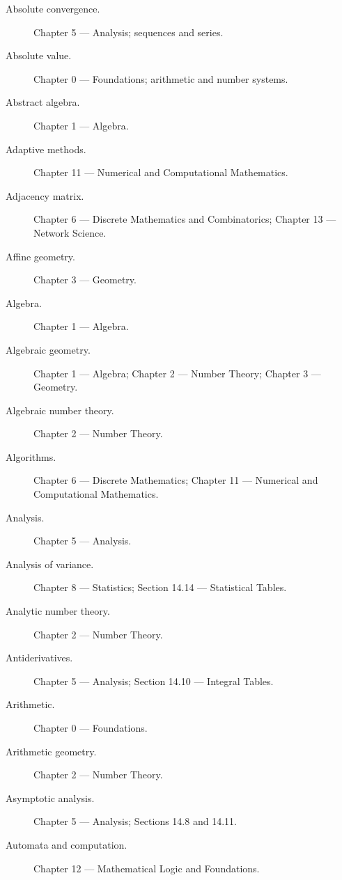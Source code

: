 \begin{description}

\item[Absolute convergence.]
Chapter 5 --- Analysis; sequences and series.

\item[Absolute value.]
Chapter 0 --- Foundations; arithmetic and number systems.

\item[Abstract algebra.]
Chapter 1 --- Algebra.

\item[Adaptive methods.]
Chapter 11 --- Numerical and Computational Mathematics.

\item[Adjacency matrix.]
Chapter 6 --- Discrete Mathematics and Combinatorics;
Chapter 13 --- Network Science.

\item[Affine geometry.]
Chapter 3 --- Geometry.

\item[Algebra.]
Chapter 1 --- Algebra.

\item[Algebraic geometry.]
Chapter 1 --- Algebra;
Chapter 2 --- Number Theory;
Chapter 3 --- Geometry.

\item[Algebraic number theory.]
Chapter 2 --- Number Theory.

\item[Algorithms.]
Chapter 6 --- Discrete Mathematics;
Chapter 11 --- Numerical and Computational Mathematics.

\item[Analysis.]
Chapter 5 --- Analysis.

\item[Analysis of variance.]
Chapter 8 --- Statistics;
Section 14.14 --- Statistical Tables.

\item[Analytic number theory.]
Chapter 2 --- Number Theory.

\item[Antiderivatives.]
Chapter 5 --- Analysis;
Section 14.10 --- Integral Tables.

\item[Arithmetic.]
Chapter 0 --- Foundations.

\item[Arithmetic geometry.]
Chapter 2 --- Number Theory.

\item[Asymptotic analysis.]
Chapter 5 --- Analysis;
Sections 14.8 and 14.11.

\item[Automata and computation.]
Chapter 12 --- Mathematical Logic and Foundations.

\end{description}

